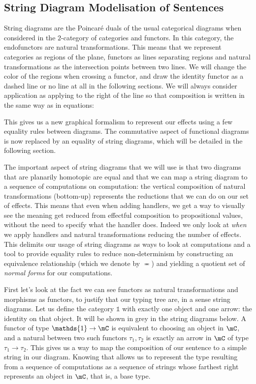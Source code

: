 \documentclass[math, english, info]{cours}
\begin{document}
\subsection{String Diagram Modelisation of Sentences}
\label{subsec:sd}
String diagrams are the Poincaré duals of the usual categorical diagrams when considered in the $2$-category of categories and functors.
In this category, the endofunctors are natural transformations.
This means that we represent categories as regions of the plane, functors as lines separating regions and natural transformations as the intersection points between two lines.
We will change the color of the regions when crossing a functor, and draw the identity functor as a dashed line or no line at all in the following sections.
We will always consider application as applying to the right of the line so that composition is written in the same way as in equations:
\begin{center}
\end{center}
This gives us a new graphical formalism to represent our effects using a few equality rules between diagrams.
The commutative aspect of functional diagrams is now replaced by an equality of string diagrams, which will be detailed in the following section.

The important aspect of string diagrams that we will use is that two diagrams that are planarily homotopic are equal \cite{joyalGeometryTensorCalculus1991} and that we can map a string diagram to a sequence of computations on computation: the vertical composition of natural transformations (bottom-up) represents the reductions that we can do on our set of effects.
This means that even when adding handlers, we get a way to visually see the meaning get reduced from effectful composition to propositional values, without the need to specify what the handler does.
Indeed we only look at \emph{when} we apply handlers and natural transformations reducing the number of effects.
This delimits our usage of string diagrams as ways to look at computations and a tool to provide equality rules to reduce non-determinism by constructing an equivalence relationship (which we denote by $\eqcirc$) and yielding a quotient set of \emph{normal forms} for our computations.

\medskip

First let's look at the fact we can see functors as natural transformations and morphisms as functors, to justify that our typing tree are, in a sense string diagrams.
Let us define the category $\mathds{1}$ with exactly one object and one arrow: the identity on that object. It will be shown in grey in the string diagrams below.
A functor of type $\mathds{1} \to \mC$ is equivalent to choosing an object in $\mC$, and a natural between two such functors $\tau_{1}, \tau_{2}$ is exactly an arrow in $\mC$ of type $\tau_{1} \to \tau_{2}$.
This gives us a way to map the composition of our sentence to a simple string in our diagram.
Knowing that allows us to represent the type resulting from a sequence of computations as a sequence of strings whose farthest right represents an object in $\mC$, that is, a base type.
\begin{center}
\end{center}
\end{document}
